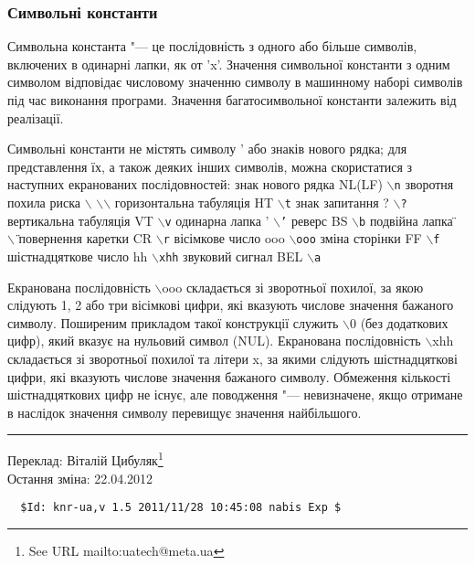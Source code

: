 \documentclass[a4paper,12pt]{book}
\begin{document}
\subsubsection{Символьні константи}


  Символьна константа "--- це послідовність з одного або більше символів, включених в
  одинарні лапки, як от 'x'. Значення символьної константи з одним символом
  відповідає числовому значенню символу в машинному наборі символів під час виконання
  програми. Значення багатосимвольної константи залежить від реалізації.

  Символьні константи не містять символу ' або знаків нового рядка; для
  представлення їх, а також деяких інших символів, можна скористатися з наступних
  екранованих послідовностей:
    {\centering                   знак нового рядка
        NL(LF)
                  \texttt{\mbox{$\backslash$}n}
                зворотня похила риска
        \mbox{$\backslash$}
                  \texttt{\mbox{$\backslash$}\mbox{$\backslash$}}
                            горизонтальна табуляція
        HT
                  \texttt{\mbox{$\backslash$}t}
                знак запитання
        ?
                  \texttt{\mbox{$\backslash$}?}
                            вертикальна табуляція
        VT
                  \texttt{\mbox{$\backslash$}v}
                одинарна лапка
        '
                  \texttt{\mbox{$\backslash$}'}
                            реверс
        BS
                  \texttt{\mbox{$\backslash$}b}
                подвійна лапка
        \"{}
                  \texttt{\mbox{$\backslash$}\"{}}
                            повернення каретки
        CR
                  \texttt{\mbox{$\backslash$}r}
                вісімкове число
        ooo
                  \texttt{\mbox{$\backslash$}ooo}
                            зміна сторінки
        FF
                  \texttt{\mbox{$\backslash$}f}
                шістнадцяткове число
        hh
                  \texttt{\mbox{$\backslash$}xhh}
                            звуковий сигнал
        BEL
                  \texttt{\mbox{$\backslash$}a}
                    }

  Екранована послідовність \mbox{$\backslash$}ooo складається зі зворотньої похилої, за
  якою слідують 1, 2 або три вісімкові цифри, які вказують числове значення бажаного
  символу. Поширеним прикладом такої конструкції служить \mbox{$\backslash$}0 (без
  додаткових цифр), який вказує на нульовий символ (NUL). Екранована послідовність
  \mbox{$\backslash$}xhh складається зі зворотньої похилої та літери x, за якими слідують
  шістнадцяткові цифри, які вказують числове значення бажаного символу. Обмеження
  кількості шістнадцяткових цифр не існує, але поводження "--- невизначене, якщо отримане
  в наслідок значення символу перевищує значення найбільшого.

  \vspace{1mm}
  \hrule
  Переклад: Віталій Цибуляк\footnote{See URL mailto:uatech@meta.ua}\\
  Остання зміна: 22.04.2012

  \begin{verbatim}
  $Id: knr-ua,v 1.5 2011/11/28 10:45:08 nabis Exp $
  \end{verbatim}
\end{document}
